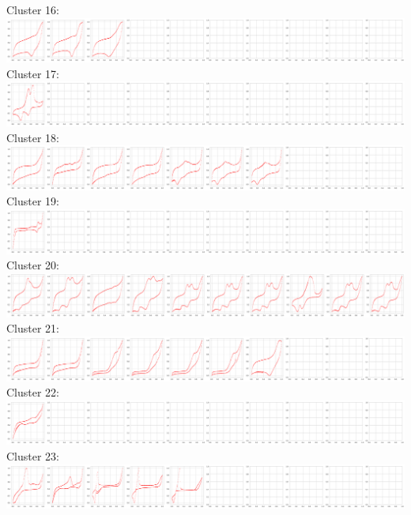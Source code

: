 Cluster 16:\\
\includegraphics[width=1.0\textwidth]{figures/clusters/cv_cluster16.png}
Cluster 17:\\
\includegraphics[width=1.0\textwidth]{figures/clusters/cv_cluster17.png}
Cluster 18:\\
\includegraphics[width=1.0\textwidth]{figures/clusters/cv_cluster18.png}
Cluster 19:\\
\includegraphics[width=1.0\textwidth]{figures/clusters/cv_cluster19.png}
Cluster 20:\\
\includegraphics[width=1.0\textwidth]{figures/clusters/cv_cluster20.png}
Cluster 21:\\
\includegraphics[width=1.0\textwidth]{figures/clusters/cv_cluster21.png}
Cluster 22:\\
\includegraphics[width=1.0\textwidth]{figures/clusters/cv_cluster22.png}
Cluster 23:\\
\includegraphics[width=1.0\textwidth]{figures/clusters/cv_cluster23.png}
